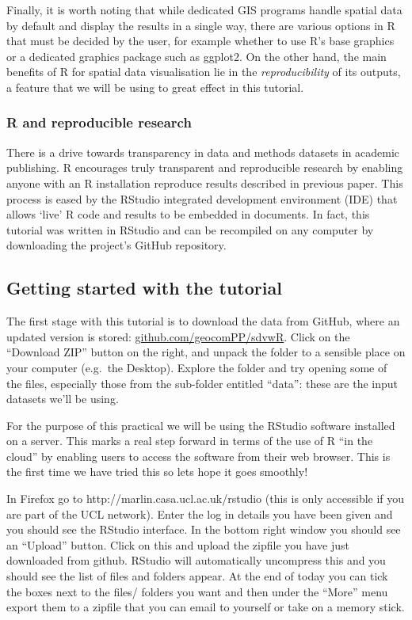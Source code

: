 \documentclass[]{article}
\begin{document}
Finally, it is worth noting that while dedicated GIS programs handle
spatial data by default and display the results in a single way, there
are various options in R that must be decided by the user, for example
whether to use R's base graphics or a dedicated graphics package such as
ggplot2. On the other hand, the main benefits of R for spatial data
visualisation lie in the \emph{reproducibility} of its outputs, a
feature that we will be using to great effect in this tutorial.

\subsubsection{R and reproducible research}

There is a drive towards transparency in data and methods datasets in
academic publishing. R encourages truly transparent and reproducible
research by enabling anyone with an R installation reproduce results
described in previous paper. This process is eased by the RStudio
integrated development environment (IDE) that allows `live' R code and
results to be embedded in documents. In fact, this tutorial was written
in RStudio and can be recompiled on any computer by downloading the
project's GitHub repository.

\subsection{Getting started with the tutorial}

The first stage with this tutorial is to download the data from GitHub,
where an updated version is stored:
\href{https://github.com/geocomPP/sdvwR}{github.com/geocomPP/sdvwR}.
Click on the ``Download ZIP'' button on the right, and unpack the folder
to a sensible place on your computer (e.g.~the Desktop). Explore the
folder and try opening some of the files, especially those from the
sub-folder entitled ``data'': these are the input datasets we'll be
using.

For the purpose of this practical we will be using the RStudio software
installed on a server. This marks a real step forward in terms of the
use of R ``in the cloud'' by enabling users to access the software from
their web browser. This is the first time we have tried this so lets
hope it goes smoothly!

In Firefox go to http://marlin.casa.ucl.ac.uk/rstudio (this is only
accessible if you are part of the UCL network). Enter the log in details
you have been given and you should see the RStudio interface. In the
bottom right window you should see an ``Upload'' button. Click on this
and upload the zipfile you have just downloaded from github. RStudio
will automatically uncompress this and you should see the list of files
and folders appear. At the end of today you can tick the boxes next to
the files/ folders you want and then under the ``More'' menu export them
to a zipfile that you can email to yourself or take on a memory stick.
\end{document}
